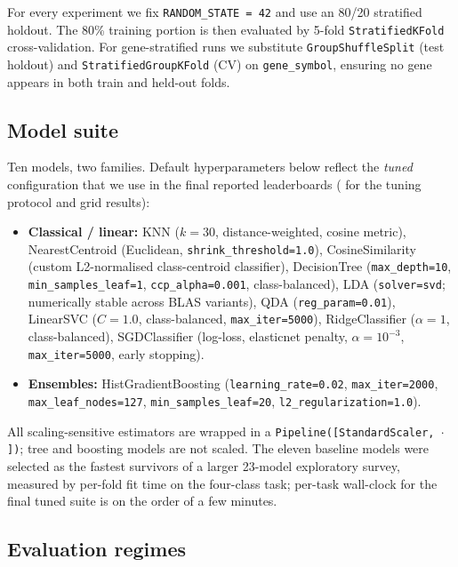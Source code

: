 \documentclass[11pt,a4paper]{article}
\begin{document}
For every experiment we fix \texttt{RANDOM\_STATE = 42} and use an 80/20 stratified
holdout. The 80\% training portion is then evaluated by 5-fold
\texttt{StratifiedKFold} cross-validation. For gene-stratified runs we substitute
\texttt{GroupShuffleSplit} (test holdout) and \texttt{StratifiedGroupKFold} (CV) on
\texttt{gene\_symbol}, ensuring no gene appears in both train and held-out folds.

\subsection{Model suite}
\label{sec:model-suite}

Ten models, two families. Default hyperparameters below reflect the
\emph{tuned} configuration that we use in the final reported leaderboards
( for the tuning protocol and grid results):
\begin{itemize}[leftmargin=*]
 \item \textbf{Classical / linear:} KNN ($k=30$, distance-weighted, cosine
 metric), NearestCentroid (Euclidean, \texttt{shrink\_threshold=1.0}),
 CosineSimilarity (custom L2-normalised class-centroid classifier),
 DecisionTree (\texttt{max\_depth=10}, \texttt{min\_samples\_leaf=1},
 \texttt{ccp\_alpha=0.001}, class-balanced),
 LDA (\texttt{solver=svd}; numerically stable across BLAS variants),
 QDA (\texttt{reg\_param=0.01}), LinearSVC ($C=1.0$, class-balanced,
 \texttt{max\_iter=5000}), RidgeClassifier ($\alpha=1$, class-balanced),
 SGDClassifier (log-loss, elasticnet penalty, $\alpha=10^{-3}$,
 \texttt{max\_iter=5000}, early stopping).
 \item \textbf{Ensembles:} HistGradientBoosting (\texttt{learning\_rate=0.02},
 \texttt{max\_iter=2000}, \texttt{max\_leaf\_nodes=127},
 \texttt{min\_samples\_leaf=20}, \texttt{l2\_regularization=1.0}).
\end{itemize}
All scaling-sensitive estimators are wrapped in a
\texttt{Pipeline([StandardScaler, $\cdot$])}; tree and boosting models are not
scaled. The eleven baseline models were selected as the fastest survivors of a
larger 23-model exploratory survey, measured by per-fold fit time on the
four-class task; per-task wall-clock for the final tuned suite is on the order
of a few minutes.

\subsection{Evaluation regimes}
\end{document}
